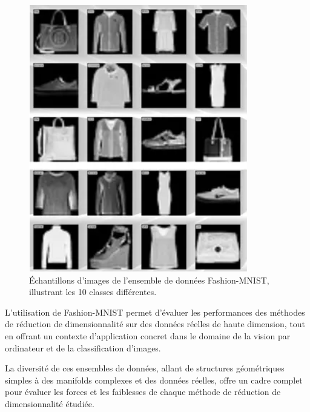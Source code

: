 \documentclass[unnumsec,webpdf,modern,large]{projet_manifold}%
\theoremstyle{thmstyleone}%
\theoremstyle{thmstyletwo}%
\theoremstyle{thmstylethree}%
\begin{document}
\begin{figure}[h]
    \centering
    \includegraphics[width=\columnwidth]{Fig/fashion_mnist.png}
    \caption{Échantillons d'images de l'ensemble de données Fashion-MNIST, illustrant les 10 classes différentes.}
    \label{fig:fashion_mnist_samples}
\end{figure}

L'utilisation de Fashion-MNIST permet d'évaluer les performances des méthodes de réduction de dimensionnalité sur des données réelles de haute dimension, tout en offrant un contexte d'application concret dans le domaine de la vision par ordinateur et de la classification d'images.

La diversité de ces ensembles de données, allant de structures géométriques simples à des manifolds complexes et des données réelles, offre un cadre complet pour évaluer les forces et les faiblesses de chaque méthode de réduction de dimensionnalité étudiée.



\end{document}
